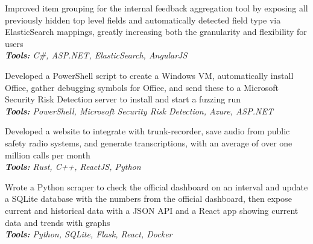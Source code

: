 \documentclass[10pt,letter]{altacv}
\begin{document}
\divider

Improved item grouping for the internal feedback aggregation tool by exposing all previously hidden top level fields and automatically detected field type via \\ ElasticSearch mappings, greatly increasing both the granularity and flexibility for users \\
\textit{\textbf{Tools:} C\#, ASP.NET, ElasticSearch, AngularJS}

Developed a PowerShell script to create a Windows VM, automatically install Office, gather debugging symbols for Office, and send these to a Microsoft Security Risk Detection server to install and start a fuzzing run \\
\textit{\textbf{Tools:} PowerShell, Microsoft Security Risk Detection, Azure, ASP.NET}

\smallskip


Developed a website to integrate with trunk-recorder, save audio from public safety radio systems, and generate transcriptions, with an average of over one million calls per month \\
\textit{\textbf{Tools:} Rust, C++, ReactJS, Python}

\divider

Wrote a Python scraper to check the official dashboard on an interval and update a SQLite database with the numbers from the official dashboard, then expose current and historical data with a JSON API and a React app showing current data and trends with graphs \\
\textit{\textbf{Tools:} Python, SQLite, Flask, React, Docker}


\end{document}
